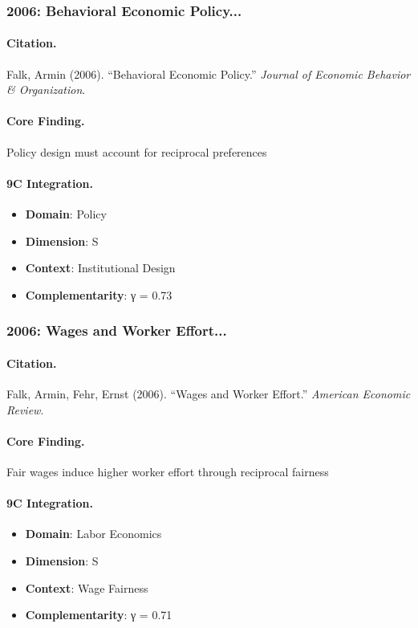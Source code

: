 \subsubsection{2006: Behavioral Economic Policy...}

\paragraph{Citation.}
Falk, Armin (2006). ``Behavioral Economic Policy.''
\textit{Journal of Economic Behavior & Organization}.

\paragraph{Core Finding.}
Policy design must account for reciprocal preferences

\paragraph{9C Integration.}
\begin{itemize}[nosep]
  \item \textbf{Domain}: Policy
  \item \textbf{Dimension}: S
  \item \textbf{Context}: Institutional Design
  \item \textbf{Complementarity}: γ = 0.73
\end{itemize}


\subsubsection{2006: Wages and Worker Effort...}

\paragraph{Citation.}
Falk, Armin, Fehr, Ernst (2006). ``Wages and Worker Effort.''
\textit{American Economic Review}.

\paragraph{Core Finding.}
Fair wages induce higher worker effort through reciprocal fairness

\paragraph{9C Integration.}
\begin{itemize}[nosep]
  \item \textbf{Domain}: Labor Economics
  \item \textbf{Dimension}: S
  \item \textbf{Context}: Wage Fairness
  \item \textbf{Complementarity}: γ = 0.71
\end{itemize}


